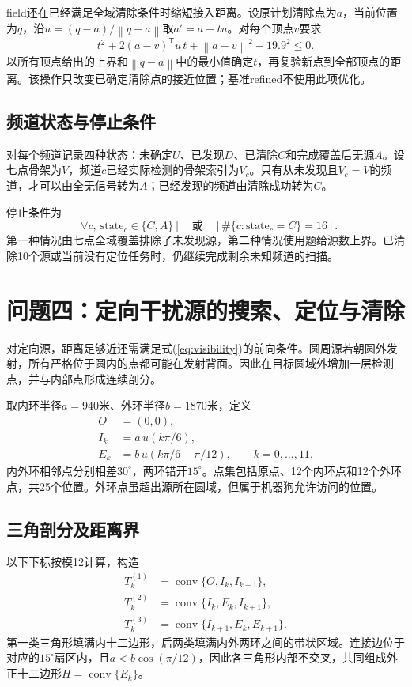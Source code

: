 \documentclass[UTF8,fontset=fandol,a4paper,zihao=-4]{ctexart}
\DeclareMathOperator{\conv}{conv}
\newcommand{\norm}[1]{\left\lVert#1\right\rVert}
\begin{document}
field还在已经满足全域清除条件时缩短接入距离。设原计划清除点为$a$，当前位置为$q$，沿$u=(q-a)/\norm{q-a}$取$a'=a+tu$。对每个顶点$v$要求
\begin{equation}
t^2+2(a-v)^{\mathsf T}u\,t+\norm{a-v}^2-19.9^2\le0.
\end{equation}
以所有顶点给出的上界和$\norm{q-a}$中的最小值确定$t$，再复验新点到全部顶点的距离。该操作只改变已确定清除点的接近位置；基准refined不使用此项优化。

\subsection{频道状态与停止条件}
对每个频道记录四种状态：未确定$U$、已发现$D$、已清除$C$和完成覆盖后无源$A$。设七点骨架为$V$，频道$c$已经实际检测的骨架索引为$V_c$。只有从未发现且$V_c=V$的频道，才可以由全无信号转为$A$；已经发现的频道由清除成功转为$C$。

停止条件为
\begin{equation}\label{eq:stop}
\left[\forall c,\ \mathrm{state}_c\in\{C,A\}\right]
\quad\text{或}\quad
\left[\#\{c:\mathrm{state}_c=C\}=16\right].
\end{equation}
第一种情况由七点全域覆盖排除了未发现源，第二种情况使用题给源数上界。已清除10个源或当前没有定位任务时，仍继续完成剩余未知频道的扫描。

\section{问题四：定向干扰源的搜索、定位与清除}
对定向源，距离足够近还需满足式(\ref{eq:visibility})的前向条件。圆周源若朝圆外发射，所有严格位于圆内的点都可能在发射背面。因此在目标圆域外增加一层检测点，并与内部点形成连续剖分。

取内环半径$a=940$米、外环半径$b=1870$米，定义
\begin{equation}\label{eq:polar-points}
\begin{aligned}
O&=(0,0),\\
I_k&=a\,u(k\pi/6),\\
E_k&=b\,u(k\pi/6+\pi/12),\qquad k=0,\ldots,11.
\end{aligned}
\end{equation}
内外环相邻点分别相差$30^\circ$，两环错开$15^\circ$。点集包括原点、12个内环点和12个外环点，共25个位置。外环点虽超出源所在圆域，但属于机器狗允许访问的位置。

\subsection{三角剖分及距离界}
以下下标按模12计算，构造
\begin{equation}\label{eq:triangulation}
\begin{aligned}
T_k^{(1)}&=\conv\{O,I_k,I_{k+1}\},\\
T_k^{(2)}&=\conv\{I_k,E_k,I_{k+1}\},\\
T_k^{(3)}&=\conv\{I_{k+1},E_k,E_{k+1}\}.
\end{aligned}
\end{equation}
第一类三角形填满内十二边形，后两类填满内外两环之间的带状区域。连接边位于对应的$15^\circ$扇区内，且$a<b\cos(\pi/12)$，因此各三角形内部不交叉，共同组成外正十二边形$H=\conv\{E_k\}$。
\end{document}
